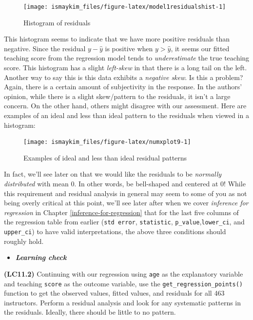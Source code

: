 \documentclass[12pt, krantz2,]{krantz}
\newenvironment{rmdblock}[1]
  {\begin{shaded*}
  \begin{itemize}
  \renewcommand{\labelitemi}{
    \raisebox{-.7\height}[0pt][0pt]{
    }
  }
  \item
  }
  {
  \end{itemize}
  \end{shaded*}
  }
\newenvironment{learncheck}
  {\begin{rmdblock}{warning}}
  {\end{rmdblock}}
\begin{document}
\begin{figure}

{\centering \texttt{[image: ismaykim\_files/figure-latex/model1residualshist-1]} 

}

\caption{Histogram of residuals}\label{fig:model1residualshist}
\end{figure}

This histogram seems to indicate that we have more positive residuals than negative. Since the residual \(y-\widehat{y}\) is positive when \(y > \widehat{y}\), it seems our fitted teaching score from the regression model tends to \emph{underestimate} the true teaching score. This histogram has a slight \emph{left-skew} in that there is a long tail on the left. Another way to say this is this data exhibits a \emph{negative skew}. Is this a problem? Again, there is a certain amount of subjectivity in the response. In the authors' opinion, while there is a slight skew/pattern to the residuals, it isn't a large concern. On the other hand, others might disagree with our assessment. Here are examples of an ideal and less than ideal pattern to the residuals when viewed in a histogram:

\begin{figure}

{\centering \texttt{[image: ismaykim\_files/figure-latex/numxplot9-1]} 

}

\caption{Examples of ideal and less than ideal residual patterns}\label{fig:numxplot9}
\end{figure}

In fact, we'll see later on that we would like the residuals to be \emph{normally distributed} with
mean 0. In other words, be bell-shaped and centered at 0! While this requirement and residual analysis in general may seem to some of you as not being overly critical at this point, we'll see later after when we cover \emph{inference for regression} in Chapter \ref{inference-for-regression} that for the last five columns of the regression table from earlier (\texttt{std\ error}, \texttt{statistic}, \texttt{p\_value},\texttt{lower\_ci}, and \texttt{upper\_ci}) to have valid interpretations, the above three conditions should roughly hold.

\begin{learncheck}
\textbf{\emph{Learning check}}
\end{learncheck}

\textbf{(LC11.2)} Continuing with our regression using \texttt{age} as the explanatory variable and teaching \texttt{score} as the outcome variable, use the \texttt{get\_regression\_points()} function to get the observed values, fitted values, and residuals for all 463 instructors. Perform a residual analysis and look for any systematic patterns in the residuals. Ideally, there should be little to no pattern.
\end{document}
